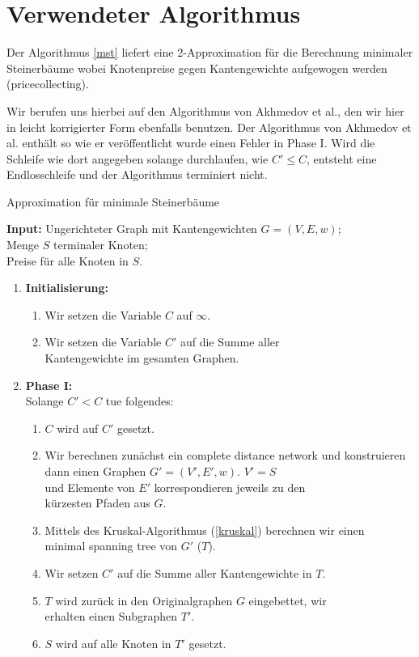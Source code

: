 \documentclass[a4paper,10pt]{article}
\begin{document}
\section{Verwendeter Algorithmus}
\label{sec:mst}
Der Algorithmus \ref{mst} liefert eine 2-Approximation für die Berechnung minimaler Steinerbäume wobei Knotenpreise gegen Kantengewichte aufgewogen werden (pricecollecting).

Wir berufen uns hierbei auf den Algorithmus von Akhmedov et al.\citep{akhmedov2014}, den wir hier in leicht korrigierter Form ebenfalls benutzen. Der Algorithmus von Akhmedov et al. enthält so wie er veröffentlicht wurde einen Fehler in Phase I. Wird die Schleife wie dort angegeben solange durchlaufen, wie $C' \leq C$, entsteht eine Endlosschleife und der Algorithmus terminiert nicht.
\bigskip

\begin{algorithm}
  \label{mst}
  \caption{Approximation für minimale Steinerbäume}
      \textbf{Input: } Ungerichteter Graph mit Kantengewichten $G = (V,E, w)$;\\ Menge $S$ terminaler Knoten;\\ Preise für alle Knoten in $S$.
      
\begin{enumerate}
\item\textbf{Initialisierung:}

\begin{enumerate}
\item Wir setzen die Variable $C$ auf $\infty$.
\item Wir setzen die Variable $C'$ auf die Summe aller\\ Kantengewichte im gesamten Graphen.
\end{enumerate}

\item\textbf{Phase I:}\\
Solange $C' < C$ tue folgendes:

\begin{enumerate}
\item $C$ wird auf $C'$ gesetzt.
\item Wir berechnen zunächst ein complete distance network und konstruieren dann einen Graphen $G' = (V', E', w)$. $V' = S$\\ und Elemente von $E'$ korrespondieren jeweils zu den \\ kürzesten Pfaden aus $G$.
\item Mittels des Kruskal-Algorithmus (\ref{kruskal}) berechnen wir einen\\ minimal spanning tree von $G'$ ($T$).
\item Wir setzen $C'$ auf die Summe aller Kantengewichte in $T$.
\item $T$ wird zurück in den Originalgraphen $G$ eingebettet, wir\\
erhalten einen Subgraphen $T'$.
\item $S$ wird auf alle Knoten in $T'$ gesetzt.
\end{enumerate}


\end{enumerate}
\end{algorithm}
\end{document}
